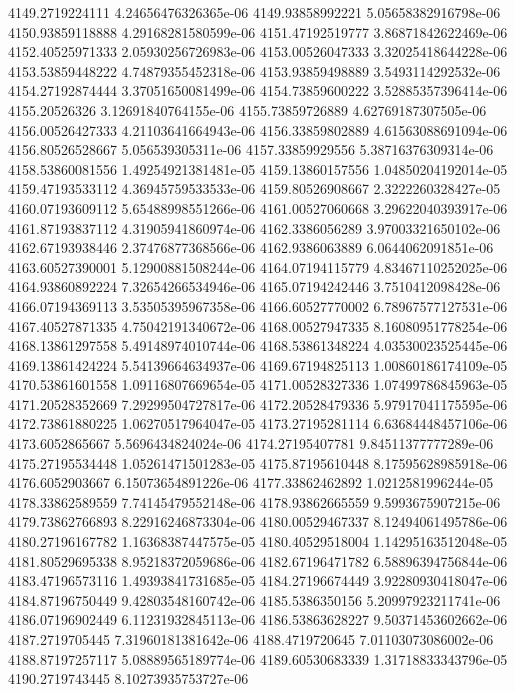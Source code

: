 {4149.2719224111 4.24656476326365e-06
4149.93858992221 5.05658382916798e-06
4150.93859118888 4.29168281580599e-06
4151.47192519777 3.86871842622469e-06
4152.40525971333 2.05930256726983e-06
4153.00526047333 3.32025418644228e-06
4153.53859448222 4.74879355452318e-06
4153.93859498889 3.5493114292532e-06
4154.27192874444 3.37051650081499e-06
4154.73859600222 3.52885357396414e-06
4155.20526326 3.12691840764155e-06
4155.73859726889 4.62769187307505e-06
4156.00526427333 4.21103641664943e-06
4156.33859802889 4.61563088691094e-06
4156.80526528667 5.056539305311e-06
4157.33859929556 5.38716376309314e-06
4158.53860081556 1.49254921381481e-05
4159.13860157556 1.04850204192014e-05
4159.47193533112 4.36945759533533e-06
4159.80526908667 2.3222260328427e-05
4160.07193609112 5.65488998551266e-06
4161.00527060668 3.29622040393917e-06
4161.87193837112 4.31905941860974e-06
4162.3386056289 3.97003321650102e-06
4162.67193938446 2.37476877368566e-06
4162.9386063889 6.0644062091851e-06
4163.60527390001 5.12900881508244e-06
4164.07194115779 4.83467110252025e-06
4164.93860892224 7.32654266534946e-06
4165.07194242446 3.7510412098428e-06
4166.07194369113 3.53505395967358e-06
4166.60527770002 6.78967577127531e-06
4167.40527871335 4.75042191340672e-06
4168.00527947335 8.16080951778254e-06
4168.13861297558 5.49148974010744e-06
4168.53861348224 4.03530023525445e-06
4169.13861424224 5.54139664634937e-06
4169.67194825113 1.00860186174109e-05
4170.53861601558 1.09116807669654e-05
4171.00528327336 1.07499786845963e-05
4171.20528352669 7.29299504727817e-06
4172.20528479336 5.97917041175595e-06
4172.73861880225 1.06270517964047e-05
4173.27195281114 6.63684448457106e-06
4173.6052865667 5.5696434824024e-06
4174.27195407781 9.84511377777289e-06
4175.27195534448 1.05261471501283e-05
4175.87195610448 8.17595628985918e-06
4176.6052903667 6.15073654891226e-06
4177.33862462892 1.0212581996244e-05
4178.33862589559 7.74145479552148e-06
4178.93862665559 9.5993675907215e-06
4179.73862766893 8.22916246873304e-06
4180.00529467337 8.12494061495786e-06
4180.27196167782 1.16368387447575e-05
4180.40529518004 1.14295163512048e-05
4181.80529695338 8.95218372059686e-06
4182.67196471782 6.58896394756844e-06
4183.47196573116 1.49393841731685e-05
4184.27196674449 3.92280930418047e-06
4184.87196750449 9.42803548160742e-06
4185.5386350156 5.20997923211741e-06
4186.07196902449 6.11231932845113e-06
4186.53863628227 9.50371453602662e-06
4187.2719705445 7.31960181381642e-06
4188.4719720645 7.01103073086002e-06
4188.87197257117 5.08889565189774e-06
4189.60530683339 1.31718833343796e-05
4190.2719743445 8.10273935753727e-06
}
